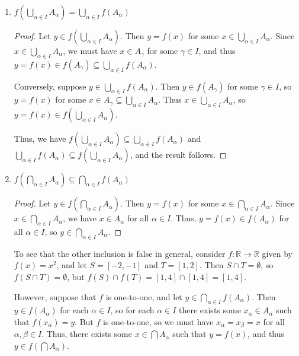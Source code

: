 \documentclass[letterpaper,12pt]{article}
\newcommand{\R}{\mathbb{R}}
\newcommand{\di}{\displaystyle}
\begin{document}
\begin{enumerate}
 \item $\di f\left(\bigcup_{\alpha\in I}A_\alpha\right) = \bigcup_{\alpha\in I}f(A_\alpha)$

\begin{proof}
 Let $y\in f\left(\bigcup_{\alpha\in I}A_\alpha\right)$. Then $y=f(x)$ for some $x\in \bigcup_{\alpha\in I}A_\alpha$. Since $x\in \bigcup_{\alpha\in I}A_\alpha$,  we must have $x\in A_\gamma$ for some $\gamma\in I$, and thus $y=f(x)\in f(A_\gamma)\subseteq \bigcup_{\alpha\in I}f(A_\alpha)$.

 Conversely, suppose $y\in \bigcup_{\alpha\in I}f(A_\alpha)$. Then $y\in f(A_\gamma)$ for some $\gamma\in I$, so $y=f(x)$ for some $x\in A_\gamma\subseteq \bigcup_{\alpha\in I}A_\alpha$. Thus $x\in \bigcup_{\alpha\in I}A_\alpha$, so $y=f(x)\in f\left(\bigcup_{\alpha\in I}A_\alpha\right)$.

 Thus, we have $f\left(\bigcup_{\alpha\in I}A_\alpha\right) \subseteq \bigcup_{\alpha\in I}f(A_\alpha)$ and $\bigcup_{\alpha\in I}f(A_\alpha)\subseteq f\left(\bigcup_{\alpha\in I}A_\alpha\right)$, and the result follows.
\end{proof}

 \item $\di f\left(\bigcap_{\alpha\in I}A_\alpha\right) \subseteq \bigcap_{\alpha\in I}f(A_\alpha)$

\begin{proof}
 Let $y\in f\left(\bigcap_{\alpha\in I}A_\alpha\right)$. Then $y=f(x)$ for some $x\in \bigcap_{\alpha\in I}A_\alpha$. Since $x\in \bigcap_{\alpha\in I}A_\alpha$, we have $x\in A_\alpha$ for all $\alpha\in I$. Thus, $y=f(x)\in f(A_\alpha)$ for all $\alpha\in I$, so $y\in \bigcap_{\alpha\in I}A_\alpha$.
\end{proof}
To see that the other inclusion is false in general, consider $f:\R\to\R$ given by $f(x)=x^2$, and let $S=[-2,-1]$ and $T=[1,2]$. Then $S\cap T=\emptyset$, so $f(S\cap T)=\emptyset$, but $f(S)\cap f(T) = [1,4]\cap [1,4]=[1,4]$.

However, suppose that $f$ is one-to-one, and let $y\in \bigcap_{\alpha\in I}f(A_\alpha)$. Then $y\in f(A_\alpha)$ for each $\alpha\in I$, so for each $\alpha\in I$ there exists some $x_\alpha\in A_\alpha$ such that $f(x_\alpha)=y$. But $f$ is one-to-one, so we must have $x_\alpha=x_\beta = x$ for all $\alpha,\beta\in I$. Thus, there exists some $x\in \bigcap A_\alpha$ such that $y=f(x)$, and thus $y\in f\left(\bigcap A_\alpha\right)$.


\end{enumerate}
\end{document}
